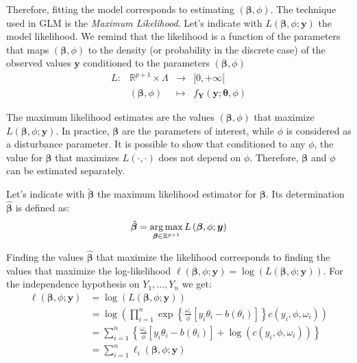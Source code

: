\documentclass[a4paper, nobind]{templates/ociamthesis}
\theoremstyle{definition}
\theoremstyle{definition}
\theoremstyle{definition}
\theoremstyle{remark}
\begin{document}
Therefore, fitting the model corresponds to estimating \(\left(\boldsymbol{\beta}, \phi\right)\). The technique used in GLM is the \emph{Maximum Likelihood}. Let's indicate with \(L\left(\boldsymbol{\beta}, \phi; \boldsymbol{y}\right)\) the model likelihood. We remind that the likelihood is a function of the parameters that maps \(\left(\boldsymbol{\beta}, \phi\right)\) to the density (or probability in the discrete case) of the observed values \(\boldsymbol{y}\) conditioned to the parameters \(\left(\boldsymbol{\beta}, \phi\right)\)
\[
\begin{array}{cccc}
L: & \mathbb{R}^{p+1} \times \Lambda & \longrightarrow & [0, +\infty[ \\
   & \left(\boldsymbol{\beta}, \phi\right) & \longmapsto & f_{\boldsymbol{Y}}(\boldsymbol{y}; \boldsymbol{\theta}, \phi)
\end{array}
\]

The maximum likelihood estimates are the values \(\left(\boldsymbol{\beta}, \phi\right)\) that maximize \(L\left(\boldsymbol{\beta}, \phi; \boldsymbol{y}\right)\). In practice, \(\boldsymbol{\beta}\) are the parameters of interest, while \(\phi\) is considered as a disturbance parameter. It is possible to show that conditioned to any \(\phi\), the value for \(\boldsymbol{\beta}\) that maximizes \(L(\cdot, \cdot)\) does not depend on \(\phi\). Therefore, \(\boldsymbol{\beta}\) and \(\phi\) can be estimated separately.

Let's indicate with \(\tilde{\boldsymbol{\beta}}\) the maximum likelihood estimator for \(\boldsymbol{\beta}\). Its determination \(\hat{\boldsymbol{\beta}}\) is defined as:
\begin{equation}
\label{eq:max-lik-est}
\hat{\boldsymbol{\beta}} = \operatorname*{arg\,max}_{\boldsymbol{\beta}\in\mathbb{R}^{p+1}}{L\left(\boldsymbol{\beta}, \phi; \boldsymbol{y}\right)}
\end{equation}

Finding the values \(\hat{\boldsymbol{\beta}}\) that maximize the likelihood corresponds to finding the values that maximize the log-likelihood \(\ell\left(\boldsymbol{\beta}, \phi; \boldsymbol{y}\right) = \log{\left(L\left(\boldsymbol{\beta}, \phi; \boldsymbol{y}\right)\right)}\). For the independence hypothesis on \(Y_1, \dots, Y_n\) we get:
\begin{align}
\nonumber
\ell\left(\boldsymbol{\beta}, \phi; \boldsymbol{y}\right) & =
\log{\left(L\left(\boldsymbol{\beta}, \phi; \boldsymbol{y}\right)\right)}
\\ \nonumber & =
\log{\left(\prod_{i=1}^{n}{\exp{\left\{ \frac{\omega_i}{\phi} \left[y_i\theta_i - b(\theta_i) \right] \right\}} c(y_i, \phi, \omega_i)}\right)}
\\ \label{eq:log-like} & =
\sum_{i=1}^{n}{
\left\{
\frac{\omega_i}{\phi} \left[y_i\theta_i - b(\theta_i) \right] + \log{\left(c(y_i, \phi, \omega_i)\right)}
\right\}
}
\\ \nonumber & =
\sum_{i=1}^{n}{\ell_i\left(\boldsymbol{\beta}, \phi; \boldsymbol{y}\right)}
\end{align}
\end{document}
